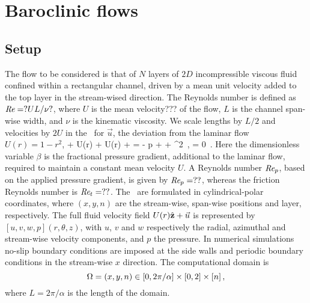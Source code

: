
\chapter{Baroclinic flows}
\label{chap:baroclinic}

\section{Setup}
\label{s:review}

The flow to be considered is that of $N$ layers of $2D$
incompressible viscous fluid
confined within a rectangular channel, driven by a mean
unit velocity added to the top layer
in the stream-wised direction.  The Reynolds number is defined as
$\textit{Re} = ?U L / \nu?$, where $U$ is the mean velocity??? of the flow,
$L$ is the channel span-wise width, and $\nu$ is the kinematic viscosity. We
scale lengths by $L/2$ and velocities by $2U$ in the \NSe\ for
$\vec{u}$, the deviation from the laminar flow
\eqv\ $U(r)=1-r^2$,
\beq
{} + U(r)\cdot\bnabla{} +
\cdot\bnabla U(r) + \cdot\bnabla{} = - {\bnabla} p
+ \frac{4\beta}{\Reynolds} +
^2 \,, \quad \nabla \cdot {} =
0 \,.
Here the dimensionless variable $\beta$ is the fractional pressure
gradient, additional to the laminar flow, required to maintain a
constant mean velocity $U$. A Reynolds number $\Reynolds_p$, based on
the applied pressure gradient, is given by $\Reynolds_p = ??$,
whereas the friction Reynolds number is
$\Reynolds_{\zeit}=??$. The \NSe\ are formulated in
cylindrical-\-polar coordinates, where $(x, y, n)$ are the
stream-wise, span-wise positions and layer,
respectively. The full fluid velocity field $U(r)\hat{{\bf z}} +
\vec{u}$ is represented by $[u,v,w,p](r,\theta,z)$, with $u$, $v$ and
$w$ respectively the radial, azimuthal and stream-wise velocity
components, and $p$ the pressure. In numerical simulations no-slip
boundary conditions are imposed at the side walls and
periodic boundary conditions in the stream-wise $x$
direction. The computational domain is
\[
\bCell={(x,y,n) \in
  [0,2\pi/\alpha]\times[0,2]\times[n]}
\,,
\] where
$L=2\pi/\alpha$ is the length of the domain.

